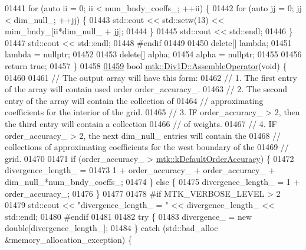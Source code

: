 \begin{DoxyCode}
{{01441   \textcolor{keywordflow}{for} (\textcolor{keyword}{auto} ii = 0; ii < num\_bndy\_coeffs\_; ++ii) \{
01442     \textcolor{keywordflow}{for} (\textcolor{keyword}{auto} jj = 0; jj < dim\_null\_; ++jj) \{
01443       std::cout << std::setw(13) << mim\_bndy\_[ii*dim\_null\_ + jj];
01444     \}
01445     std::cout << std::endl;
01446   \}
01447   std::cout << std::endl;
01448 \textcolor{preprocessor}{  #endif}
01449 
01450   \textcolor{keyword}{delete}[] lambda;
01451   lambda = \textcolor{keyword}{nullptr};
01452 
01453   \textcolor{keyword}{delete}[] alpha;
01454   alpha = \textcolor{keyword}{nullptr};
01455 
01456   \textcolor{keywordflow}{return} \textcolor{keyword}{true};
01457 \}
01458 
\hypertarget{mtk__div__1d_8cc_source_l01459}{}\hyperlink{classmtk_1_1Div1D_a5a12482e1ceac232339dd8f647af886b}{01459} \textcolor{keywordtype}{bool} \hyperlink{classmtk_1_1Div1D_a5a12482e1ceac232339dd8f647af886b}{mtk::Div1D::AssembleOperator}(\textcolor{keywordtype}{void}) \{
01460 
01461   \textcolor{comment}{// The output array will have this form:}
01462   \textcolor{comment}{// 1. The first entry of the array will contain used order order\_accuracy\_.}
01463   \textcolor{comment}{// 2. The second entry of the array will contain the collection of}
01464   \textcolor{comment}{// approximating coefficients for the interior of the grid.}
01465   \textcolor{comment}{// 3. IF order\_accuracy\_ > 2, then the third entry will contain a collection}
01466   \textcolor{comment}{// of weights.}
01467   \textcolor{comment}{// 4. IF order\_accuracy\_ > 2, the next dim\_null\_ entries will contain the}
01468   \textcolor{comment}{// collections of approximating coefficients for the west boundary of the}
01469   \textcolor{comment}{// grid.}
01470 
01471   \textcolor{keywordflow}{if} (order\_accuracy\_ > \hyperlink{group__c01-roots_ga0d95560098eb36420511103637b6952f}{mtk::kDefaultOrderAccuracy}) \{
01472     divergence\_length\_ =
01473       1 + order\_accuracy\_ + order\_accuracy\_ + dim\_null\_*num\_bndy\_coeffs\_;
01474   \} \textcolor{keywordflow}{else} \{
01475     divergence\_length\_ = 1 + order\_accuracy\_;
01476   \}
01477 
01478 \textcolor{preprocessor}{  #if MTK\_VERBOSE\_LEVEL > 2}
01479   std::cout << \textcolor{stringliteral}{"divergence\_length\_ = "} << divergence\_length\_ << std::endl;
01480 \textcolor{preprocessor}{  #endif}
01481 
01482   \textcolor{keywordflow}{try} \{
01483     divergence\_ = \textcolor{keyword}{new} \textcolor{keywordtype}{double}[divergence\_length\_];
01484   \} \textcolor{keywordflow}{catch} (std::bad\_alloc &memory\_allocation\_exception) \{
}}
\end{DoxyCode}
